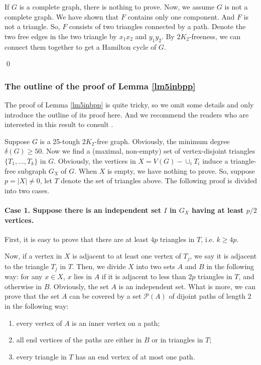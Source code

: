 \documentclass[12pt]{report}
\begin{document}
If $G$ is a complete graph, there is nothing to prove. Now, we assume $G$ is not a complete graph. We have shown that $F$ contains only one component. And $F$ is not a triangle. So, $F$ consists of two triangles connected by a path. Denote the two free edges in the two triangle by $x_1x_2$ and $y_1y_2$. By $2K_2$-freeness, we can connect them together to get a Hamilton cycle of $G$.





\qed



\subsubsection{The outline of the proof of Lemma \ref{lm5inbpp}}

The proof of Lemma \ref{lm5inbpp} is quite tricky, so we omit some details and only introduce the outline of its proof here. And we recommend the readers who are interested in this result to consult \cite{broersma2014toughness}.

Suppose $G$ is a 25-tough $2K_2$-free graph. Obviously, the minimum degree $\delta(G)\ge50$. Now we find a (maximal, non-empty) set of vertex-disjoint triangles $\{T_1,\ldots,T_k\}$ in $G$. Obviously, the vertices in $X=V(G)-\cup_iT_i$ induce a triangle-free subgraph $G_X$ of $G$. When $X$ is empty, we have nothing to prove. So, suppose $p=|X|\neq0$, let $T$ denote the set of triangles above.
The following proof is divided into two cases.

\paragraph{Case 1. Suppose there is an independent set $I$ in $G_X$ having at least $p/2$ vertices.}

First, it is easy to prove that there are at least $4p$ triangles in $T$, i.e. $k\ge4p$.

Now, if a vertex in $X$ is adjacent to at least one vertex of $T_j$, we say it is adjacent to the triangle $T_j$ in $T$. Then, we divide $X$ into two sets $A$ and $B$ in the following way:
for any $x\in X$, $x$ lies in $A$ if it is adjacent to less than $2p$ triangles in $T$, and otherwise in $B$. Obviously, the set $A$ is an independent set. What is more, we can prove that the set $A$ can be covered by a set $\mathcal{P}(A)$ of dijoint paths of length 2 in the following way:
\begin{enumerate}
\item every vertex of $A$ is an inner vertex on a path;
\item all end vertices of the paths are either in $B$ or in triangles in $T$;
\item every triangle in $T$ has an end vertex of at most one path.
\end{enumerate}
\end{document}
